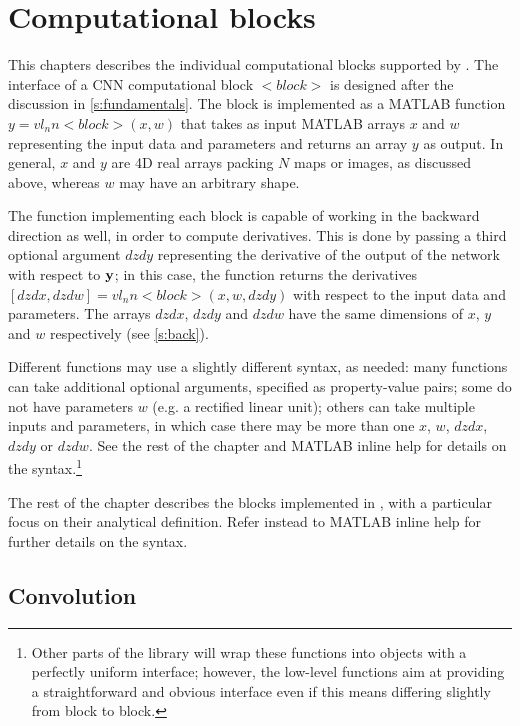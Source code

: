 \section{Computational blocks}\label{s:blocks}

This chapters describes the individual computational blocks supported by \matconvnet. The interface of a CNN computational block $<block>$ is designed after the discussion in \cref{s:fundamentals}. The block is implemented as a MATLAB function $y = vl_nn<block>(x,w)$ that takes as input MATLAB arrays $x$ and $w$ representing the input data and parameters and returns an array $y$ as output. In general, $x$ and $y$ are 4D real arrays packing $N$ maps or images, as discussed above, whereas $w$ may have an arbitrary shape.

The function implementing each block is capable of working in the backward direction as well, in order to compute derivatives. This is done by passing a third optional argument $dzdy$ representing the derivative of the output of the network with respect to $\mathbf{y}$; in this case, the function returns the derivatives $[dzdx,dzdw] = vl_nn<block>(x,w,dzdy)$ with respect to the input data and parameters. The arrays $dzdx$, $dzdy$ and $dzdw$ have the same dimensions of $x$, $y$ and $w$ respectively (see \cref{s:back}).

Different functions may use a slightly different syntax, as needed: many functions can take additional optional arguments, specified as property-value pairs; some do not have parameters  $w$ (e.g. a rectified linear unit); others can take multiple inputs and parameters, in which case there may be more than one $x$, $w$, $dzdx$, $dzdy$ or $dzdw$. See the rest of the chapter and MATLAB inline help for details on the syntax.\footnote{Other parts of the library will wrap these functions into objects with a perfectly uniform interface; however, the low-level functions aim at providing a straightforward and obvious interface even if this means differing slightly from block to block.}

The rest of the chapter describes the blocks implemented in \matconvnet, with a particular focus on their analytical definition. Refer instead to MATLAB inline help for further details on the syntax.

\subsection{Convolution}\label{s:convolution}


